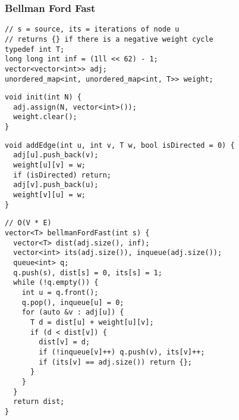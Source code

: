 \documentclass[twoside]{article}
\begin{document}
\begin{multicols*}{2}
\subsubsection*{Bellman Ford Fast}
\begin{verbatim}
// s = source, its = iterations of node u
// returns {} if there is a negative weight cycle
typedef int T;
long long int inf = (1ll << 62) - 1;
vector<vector<int>> adj;
unordered_map<int, unordered_map<int, T>> weight;
\end{verbatim}
\vspace{-12pt}
\begin{verbatim}
void init(int N) {
  adj.assign(N, vector<int>());
  weight.clear();
}
\end{verbatim}
\vspace{-12pt}
\begin{verbatim}
void addEdge(int u, int v, T w, bool isDirected = 0) {
  adj[u].push_back(v);
  weight[u][v] = w;
  if (isDirected) return;
  adj[v].push_back(u);
  weight[v][u] = w;
}
\end{verbatim}
\vspace{-12pt}
\begin{verbatim}
// O(V * E)
vector<T> bellmanFordFast(int s) {
  vector<T> dist(adj.size(), inf);
  vector<int> its(adj.size()), inqueue(adj.size());
  queue<int> q;
  q.push(s), dist[s] = 0, its[s] = 1;
  while (!q.empty()) {
    int u = q.front();
    q.pop(), inqueue[u] = 0;
    for (auto &v : adj[u]) {
      T d = dist[u] + weight[u][v];
      if (d < dist[v]) {
        dist[v] = d;
        if (!inqueue[v]++) q.push(v), its[v]++;
        if (its[v] == adj.size()) return {};
      }
    }
  }
  return dist;
}
\end{verbatim}

\subsubsectionfont{\large\bfseries\sffamily\underline}

\end{multicols*}
\end{document}

